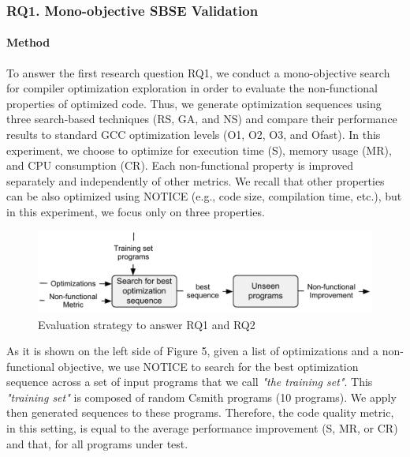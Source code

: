 \subsubsection{RQ1. Mono-objective SBSE Validation}
\paragraph{Method}

To answer the first research question RQ1, we conduct a mono-objective search for compiler optimization exploration in order to evaluate the non-functional properties of optimized code. Thus, we generate optimization sequences using three search-based techniques (RS, GA, and NS) and compare their performance results to standard GCC optimization levels (O1, O2, O3, and Ofast). 
In this experiment, we choose to optimize for execution time (S), memory usage (MR), and CPU consumption (CR). Each non-functional property is improved separately and independently of other metrics. We recall that other properties can be also optimized using NOTICE (e.g., code size, compilation time, etc.), but in this experiment, we focus only on three properties.
\vspace{-1em}
\begin{figure}[h]
	\centering
	\includegraphics[width=1.\linewidth]{chapitre3/fig/sensitivity.pdf}
	\caption{Evaluation strategy to answer RQ1 and RQ2}
	
\end{figure}

\setlength\abovecaptionskip{0.25ex}
As it is shown on the left side of Figure 5, given a list of optimizations and a non-functional objective, we use NOTICE to search for the best optimization sequence across a set of input programs that we call \textit{"the training set"}. This \textit{"training set"} is composed of random Csmith programs (10 programs). We apply then generated sequences to these programs. Therefore, the code quality metric, in this setting, is equal to the average performance improvement (S, MR, or CR) and that, for all programs under test. 


